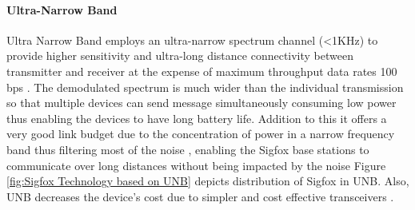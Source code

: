 \documentclass[12pt]{article}
\begin{document}
\begin{table}[H]
\caption{Radio Frequency distribution of Sigfox worldwide \cite{SigfoxRCZone}}

\label{table:SigfoxRCZone}
\end{table}

\paragraph{Ultra-Narrow Band}

Ultra Narrow Band employs an ultra-narrow spectrum channel (<1KHz) to provide higher sensitivity and ultra-long distance connectivity between transmitter and receiver at the expense of maximum throughput data rates 100 bps \cite{raza2017low,bardyn2016iot,mekki2019comparative}. The demodulated spectrum is much wider than the individual transmission so that multiple devices can send message simultaneously consuming low power thus enabling the devices to have long battery life. Addition to this it offers a very good link budget due to the concentration of power in a narrow frequency band thus filtering most of the noise \cite{naik2018lpwan,7417420}, enabling the Sigfox base stations to communicate over long distances without being impacted by the noise \cite{SigfoxTechnicalDoc} Figure \ref{fig:Sigfox Technology based on UNB} depicts distribution of Sigfox in UNB. Also, UNB decreases the device's cost due to simpler and cost effective transceivers \cite{roth2018physical}.
\end{document}
